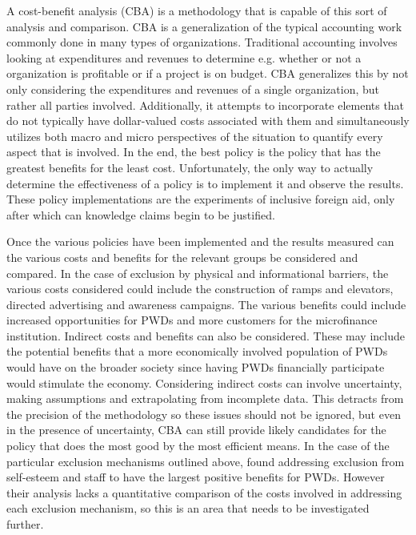 \documentclass[a4paper]{article}
\begin{document}
A cost-benefit analysis (CBA) is a methodology that is capable of this sort of
analysis and comparison. CBA is a generalization of the typical accounting
work commonly done in many types of organizations. Traditional accounting
involves looking at expenditures and revenues to determine e.g. whether or not
a organization is profitable or if a project is on budget. CBA generalizes
this by not only considering the expenditures and revenues of a single
organization, but rather all parties involved. Additionally, it attempts to
incorporate elements that do not typically have dollar-valued costs associated
with them \citep{mishan2015elements} and simultaneously utilizes both macro
and micro perspectives of the situation to quantify every aspect that is
involved. In the end, the best policy is the policy that has the greatest
benefits for the least cost. Unfortunately, the only way to actually determine
the effectiveness of a policy is to implement it and observe the results.
These policy implementations are the experiments of inclusive foreign aid,
only after which can knowledge claims begin to be justified. 

Once the various policies have been implemented and the results measured can
the various costs and benefits for the relevant groups be considered and
compared. In the case of exclusion by physical and informational barriers, the
various costs considered could include the construction of ramps and
elevators, directed advertising and awareness campaigns. The various benefits
could include increased opportunities for PWDs and more customers for the
microfinance institution. Indirect costs and benefits can also be considered.
These may include the potential benefits that a more economically involved
population of PWDs would have on the broader society since having PWDs
financially participate would stimulate the economy. Considering indirect
costs can involve uncertainty, making assumptions and extrapolating from
incomplete data. This detracts from the precision of the methodology so these
issues should not be ignored, but even in the presence of uncertainty, CBA can
still provide likely candidates for the policy that does the most good by the
most efficient means. In the case of the particular exclusion mechanisms
outlined above, \cite{mersland2008access} found addressing exclusion from
self-esteem and staff to have the largest positive benefits for PWDs. However
their analysis lacks a quantitative comparison of the costs involved in
addressing each exclusion mechanism, so this is an area that needs to be
investigated further.
\end{document}
